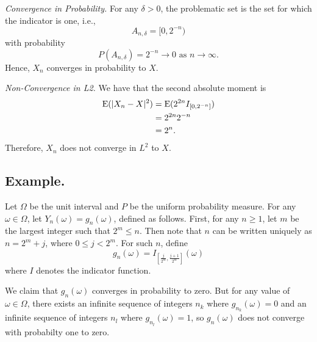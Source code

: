\documentclass[titlepage]{article}
\begin{document}
\textit{Convergence in Probability.} For any $\delta > 0$, the problematic set is the set for which the indicator is one, i.e., 
$$A_{n,\delta} = [0, 2^{-n})$$
with probability
$$P(A_{n,\delta}) = 2^{-n} \to 0 \text{ as } n \to \infty.$$
Hence, $X_{n}$ converges in probability to $X$.

\textit{Non-Convergence in L2.} We have that the second absolute moment is 
\begin{align*}
    \text{E}(|X_{n} - X|^{2}) &= \text{E}(2^{2n}I_{[0, 2^{-n}]}) \\
                        &= 2^{2n}2^{-n} \\
                        &= 2^{n}.
\end{align*}
Therefore, $X_{n}$ does not converge in $L^{2}$ to $X$.

\subsection{Example.} Let $\Omega$ be the unit interval and $P$ be the uniform probability measure. For any $\omega \in \Omega$, let $Y_n(\omega) = g_n(\omega)$, defined as follows. First, for any $n \geq 1$, let $m$ be the largest integer such that $2^m \leq n$. Then note that $n$ can be written uniquely as $n = 2^m + j$, where $0 \leq j < 2^m$. For such $n$, define
$$g_n(\omega) = I_{\left[\frac{j}{2^m}, \frac{j+1}{2^m}\right]}(\omega)$$
where $I$ denotes the indicator function.

We claim that $g_n(\omega)$ converges in probability to zero. But for any value of $\omega \in \Omega$, there exists an infinite sequence of integers $n_k$ where $g_{n_k}(\omega) = 0$ and an infinite sequence of integers $n_l$ where $g_{n_l}(\omega) = 1$, so $g_n(\omega)$ does not converge with probabilty one to zero.
\end{document}
